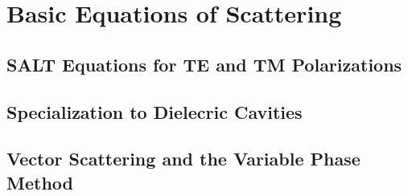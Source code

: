 \chapter{Basic Equations of Scattering}\label{app:basicEquations}

\section{SALT Equations for TE and TM Polarizations}

\section{Specialization to Dielecric Cavities}

\section{Vector Scattering and the Variable Phase Method}